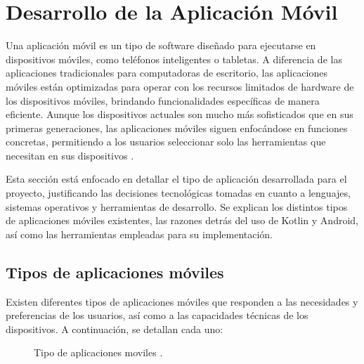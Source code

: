 
\section{Desarrollo de la Aplicación Móvil}

Una aplicación móvil es un tipo de software diseñado para ejecutarse en dispositivos móviles, como teléfonos inteligentes o tabletas. A diferencia de las aplicaciones tradicionales para computadoras de escritorio, las aplicaciones móviles están optimizadas para operar con los recursos limitados de hardware de los dispositivos móviles, brindando funcionalidades específicas de manera eficiente. Aunque los dispositivos actuales son mucho más sofisticados que en sus primeras generaciones, las aplicaciones móviles siguen enfocándose en funciones concretas, permitiendo a los usuarios seleccionar solo las herramientas que necesitan en sus dispositivos \cite{IM1}.

Esta sección está enfocado en detallar el tipo de aplicación desarrollada para el proyecto, justificando las decisiones tecnológicas tomadas en cuanto a lenguajes, sistemas operativos y herramientas de desarrollo. Se explican los distintos tipos de aplicaciones móviles existentes, las razones detrás del uso de Kotlin y Android, así como las herramientas empleadas para su implementación.

\subsection{Tipos de aplicaciones móviles}
Existen diferentes tipos de aplicaciones móviles que responden a las necesidades y preferencias de los usuarios, así como a las capacidades técnicas de los dispositivos. A continuación, se detallan cada uno:

\begin{figure}[htbp]
	\begin{center}
		\caption{Tipo de aplicaciones moviles \cite{IM1}.}
		\label{fig:casosDeUso}
	\end{center}
\end{figure}

